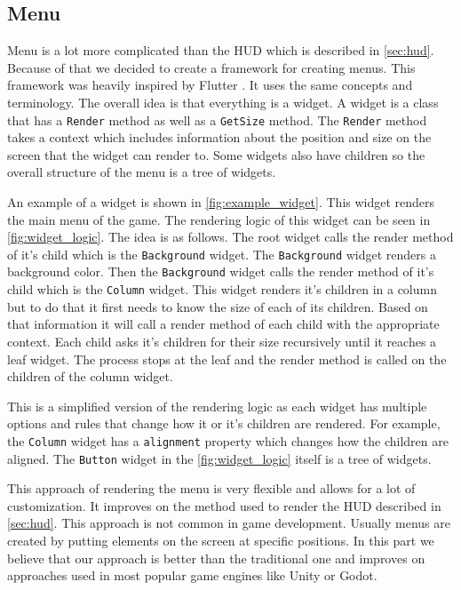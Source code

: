 \subsection{Menu} \label{sec:menu}
Menu is a lot more complicated than the HUD which is described in \autoref{sec:hud}.
Because of that we decided to create a framework for creating menus.
This framework was heavily inspired by Flutter \cite{flutter}.
It uses the same concepts and terminology.
The overall idea is that everything is a widget.
A widget is a class that has a \texttt{Render} method as well as a \texttt{GetSize} method.
The \texttt{Render} method takes a context which includes information about the position and size on the screen that the widget can render to.
Some widgets also have children so the overall structure of the menu is a tree of widgets.

An example of a widget is shown in \autoref{fig:example_widget}.
This widget renders the main menu of the game.
The rendering logic of this widget can be seen in \autoref{fig:widget_logic}.
The idea is as follows.
The root widget calls the render method of it's child which is the \texttt{Background} widget.
The \texttt{Background} widget renders a background color.
Then the \texttt{Background} widget calls the render method of it's child which is the \texttt{Column} widget.
This widget renders it's children in a column but to do that it first needs to know the size of each of its children.
Based on that information it will call a render method of each child with the appropriate context.
Each child asks it's children for their size recursively until it reaches a leaf widget.
The process stops at the leaf and the render method is called on the children of the column widget.

This is a simplified version of the rendering logic as each widget has multiple options and rules that change how it or it's children are rendered.
For example, the \texttt{Column} widget has a \texttt{alignment} property which changes how the children are aligned.
The \texttt{Button} widget in the \autoref{fig:widget_logic} itself is a tree of widgets.

This approach of rendering the menu is very flexible and allows for a lot of customization.
It improves on the method used to render the HUD described in \autoref{sec:hud}.
This approach is not common in game development.
Usually menus are created by putting elements on the screen at specific positions. %
In this part we believe that our approach is better than the traditional one and improves on approaches used in most popular game engines like Unity or Godot.

